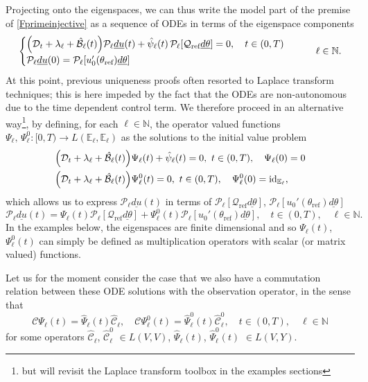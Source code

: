 \documentclass[12pt]{article}
\newcommand\uld[1]{\underline{d#1}}
\newcommand\DD{\mathcal{D}}
\newcommand\BB{\mathcal{B}}
\newcommand\Proj{\mathcal{P}}
\newcommand\ellnew{\ell}
\newcommand\hrefprime{\mathcal{Q}_{\text{ref}}}
\begin{document}
Projecting onto the eigenspaces, we can thus write the model part of the premise of \eqref{Fprimeinjective} as a sequence of ODEs in terms of the eigenspace components
\[
\begin{cases}
\Bigl(\DD_t+\lambda_\ell+\hat{\BB}_\ellnew(t)\Bigr)\Proj_\ell\uld{u}(t)+\hat{\psi}_\ellnew(t)\,\Proj_\ell[\hrefprime\uld{\theta}]=0, \quad t\in(0,T)\\  
\Proj_\ell\uld{u}(0)=\Proj_\ell[u_0'(\theta_{\text{ref}})\uld{\theta}]
\end{cases} \qquad \ell\in\mathbb{N}.
\]
At this point, previous uniqueness proofs often resorted to Laplace transform techniques; this is here impeded by the fact that the ODEs are non-autonomous due to the time dependent control term.
We therefore proceed in an alternative way\footnote{but will revisit the Laplace transform toolbox in the examples sections}, by defining,
for each $\ell\in\mathbb{N}$, the operator valued functions $\Psi_\ell,\,\Psi_\ell^0:[0,T)\to
L(\mathbb{E}_\ell,\mathbb{E}_\ell)
$ as the solutions to the initial value problem  
\begin{equation}\label{Psi_ell}
\begin{aligned}
&\Bigl(\DD_t+\lambda_\ell+\hat{\BB}_\ellnew(t)\Bigr)\Psi_\ell(t)+\hat{\psi}_\ellnew(t)=0, \ t\in(0,T),\quad \Psi_\ell(0)=0\\  
&\Bigl(\DD_t+\lambda_\ell+\hat{\BB}_\ellnew(t)\Bigr)\Psi_\ell^0(t)=0, \ t\in(0,T),\quad \Psi_\ell^0(0)=\text{id}_{\mathbb{E}_\ell},
\end{aligned}
\end{equation}
which allows us to express 
$\Proj_\ell\uld{u}(t)$ in terms of $\Proj_\ell[\hrefprime\uld{\theta}]$, $\Proj_\ell[u_0'(\theta_{\text{ref}})\uld{\theta}]$
\begin{equation}\label{bfroma}
\Proj_\ell\uld{u}(t)=
\Psi_\ell(t) \Proj_\ell[\hrefprime\uld{\theta}] + \Psi_\ell^0(t)\Proj_\ell[u_0'(\theta_{\text{ref}})\uld{\theta}], 
\quad t\in(0,T),\quad \ell\in\mathbb{N}.
\end{equation}
In the examples below, the eigenspaces are finite dimensional and so $\Psi_\ell(t)$, $\Psi_\ell^0(t)$ can simply be defined as multiplication operators with scalar (or matrix valued) functions.

Let us for the moment consider the case that we also have a commutation relation between these ODE solutions with the observation operator, in the sense that 
\begin{equation}\label{commC}
\mathcal{C}\Psi_\ell(t)=\hat{\Psi}_\ell(t) \hat{\mathcal{C}}_\ellnew, \quad
\mathcal{C}\Psi_\ell^0(t)=\hat{\Psi}_\ell^0(t) \hat{\mathcal{C}}_\ellnew^0, \quad 
t\in(0,T),\quad \ell\in\mathbb{N}
\end{equation}
for some operators $\hat{\mathcal{C}}_\ellnew$, $\hat{\mathcal{C}}^0_\ellnew$ $\in L(V,V)$, $\hat{\Psi}_\ell(t)$, $\hat{\Psi}_\ell^0(t)$ $\in L(V,Y)$.
\end{document}
